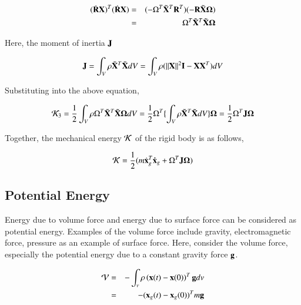 \begin{eqnarray}
(\dot{\mathbf{R}}\mathbf{X})^T(\dot{\mathbf{R}}\mathbf{X})
&=& (-\Omega^T\tilde{\mathbf{X}}^T\mathbf{R}^T)(-\mathbf{R}\tilde{\mathbf{X}}\mathbf{\Omega})\\
&=& \Omega^T\tilde{\mathbf{X}}^T\tilde{\mathbf{X}}\mathbf{\Omega}
\end{eqnarray}

Here, the moment of inertia $\mathbf{J}$

\begin{tcolorbox}[title=moment of inertia]
\begin{equation}
\mathbf{J} = \int_V \rho\tilde{\mathbf{X}}^T \tilde{\mathbf{X}}dV = \int_V \rho(||\mathbf{X}||^2\mathbf{I} - \mathbf{X}\mathbf{X}^T )dV
\end{equation}
\end{tcolorbox}

Substituting into the above equation,

\begin{equation}
{\cal K}_3 = \frac{1}{2}\int_V\rho \Omega^T\tilde{\mathbf{X}}^T\tilde{\mathbf{X}}\mathbf{\Omega}dV  = \frac{1}{2}\Omega^T\{\int_V\rho \tilde{\mathbf{X}}^T\tilde{\mathbf{X}}dV\}\mathbf{\Omega}  = \frac{1}{2}\Omega^T \mathbf{J} \mathbf{\Omega}
\end{equation}


Together, the mechanical energy ${\cal K}$ of the rigid body is as follows,

\begin{tcolorbox}[title=kinetic energy]
\begin{equation}
{\cal K} = \frac{1}{2}(m\dot{\mathbf{x}}_g^T \mathbf{\dot{x}}_g + \Omega^T \mathbf{J} \mathbf{\Omega})
\end{equation}
\end{tcolorbox}

\subsection{Potential Energy}

Energy due to volume force and energy due to surface force can be considered as potential energy. 
%
Examples of the volume force include gravity, electromagnetic force, pressure as an example of surface force. 
%
Here, consider the volume force, especially the potential energy due to a constant gravity force $\mathbf{g}$.

\begin{eqnarray}
{\cal V}
&=& -\int_v \rho\left(\mathbf{x}(t)-\mathbf{x}(0)\right)^T \mathbf{g} dv\\
&=& -(\mathbf{x}_g(t)-\mathbf{x}_g(0))^Tm\mathbf{g}
\end{eqnarray}

